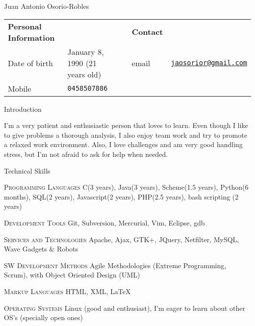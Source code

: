 \documentclass[spanish,10pt,letterpaper]{article}
\begin{document}
\centering
\begin{cv}{Juan Antonio Osorio-Robles}


	\begin{table}[h]
		\begin{tabular}{@{} l l p{0.5cm} l r}
			{\bf Personal Information}	&	&	&	{\bf Contact}	&	\\
			Date of birth &	January 8, 1990 (21 years old)	&	&
			email	&	\href{mailto:jaosorior@gmail.com}	{\tt jaosorior@gmail.com}	\\
			Mobile &	{\tt 0458507886}
		\end{tabular}
	\end{table}

	\begin{cvlist}{Introduction}
		\item[	]
			I'm a very patient and enthusiastic person that loves to learn. Even though I like to give problems a thorough analysis, I also enjoy team work and try to promote a relaxed work environment. Also, I love challenges and am very good handling stress, but I'm not afraid to ask for help when needed.
	\end{cvlist}

	
	\begin{cvlist}{Technical Skills}
			\item [\textsc{Programming Languages}]
				C(3 years), Java(3 years), Scheme(1.5 years), Python(6 months), SQL(2 years), Javascript(2 years), PHP(2.5 years), bash scripting (2 years)
			\item [\textsc{Development Tools}]
				Git, Subversion, Mercurial, Vim, Eclipse, gdb
			\item [\textsc {Services and Technologies}]
				Apache, Ajax, GTK+, JQuery, Netfilter, MySQL, Wave Gadgets \& Robots
			\item [\textsc {SW Development Methods}]
				Agile Methodologies (Extreme Programming, Scrum), with Object Oriented Design (UML)
			\item [\textsc {Markup Languages}]
				HTML, XML,
				\LaTeX
			\item [\textsc {Operating Systems}]
				Linux (good and enthusiast), I'm eager to learn about other OS's (specially open ones)
	\end{cvlist}


\end{cv}
\end{document}
